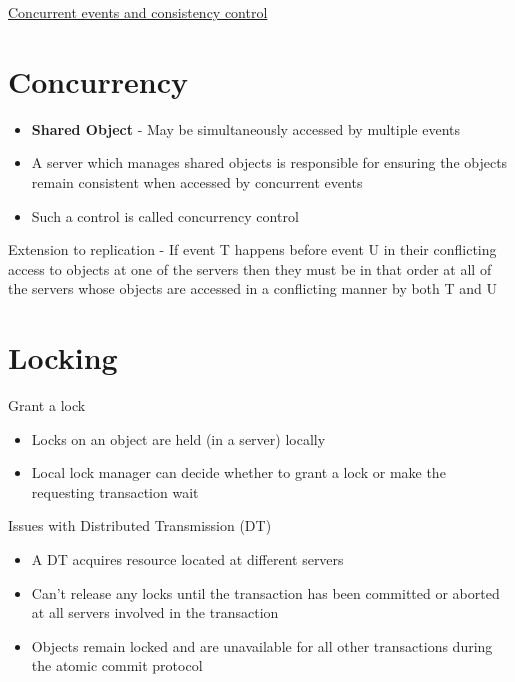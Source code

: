 \documentclass{article}[18pt]
\begin{document}
\begin{center}
\underline{\huge Concurrent events and consistency control}
\end{center}
\section{Concurrency}
\begin{itemize}
	\item \textbf{Shared Object} - May be simultaneously accessed by multiple events
	\item A server which manages shared objects is responsible for ensuring the objects remain consistent when accessed by concurrent events
	\item Such a control is called concurrency control
\end{itemize}
Extension to replication - If event T happens before event U in their conflicting access to objects at one of the servers then they must be in that order at all of the servers whose objects are accessed in a conflicting manner by both T and U
\section{Locking}
Grant a lock
\begin{itemize}
	\item Locks on an object are held (in a server) locally
	\item Local lock manager can decide whether to grant a lock or make the requesting transaction wait
\end{itemize}
Issues with Distributed Transmission (DT)
\begin{itemize}
	\item A DT acquires resource located at different servers
	\item Can't release any locks until the transaction has been committed or aborted at all servers involved in the transaction
	\item Objects remain locked and are unavailable for all other transactions during the atomic commit protocol
\end{itemize}
\end{document}
